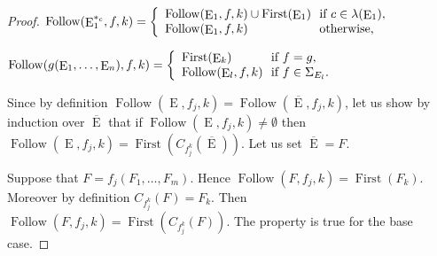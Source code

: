 \documentclass{llncs}
\DeclareMathOperator{\E}{E}
\DeclareMathOperator{\First}{First}
\DeclareMathOperator{\Follow}{Follow}
\def\b#1{\overline{#1}}
\begin{document}
\begin{proof}
  \centerline{
    $\Follow(\E_1^{*_c},f,k)=
      \left\{
        \begin{array}{l@{\ }l}
          \Follow(\E_1,f,k) \cup \First(\E_1) & \text{ if } c\in\lambda(\E_1),\\
          \Follow(\E_1,f,k) & \text{ otherwise,}\\ 
        \end{array}
      \right.$
  }
  
  \centerline{
    $\Follow(g(\E_1,\ldots,\E_n),f,k)=
      \left\{
        \begin{array}{l@{\ }l}
          \First(\E_k) & \text{ if } f=g,\\
          \Follow(\E_l,f,k) & \text{ if } f\in \Sigma_{E_l}.\\ 
        \end{array}
      \right.$
  }
  
Since by definition $\Follow(\E,f_j,k)=\Follow(\b\E,f_j,k)$, let us show by induction over $\b \E$ that if $\Follow(\E,f_j,k)\neq \emptyset$ then $\Follow(\E,f_j,k)=\First(C_{f_j^k}(\overline{\E}))$. Let us set $\b\E=F$.
 
Suppose that $F=f_j(F_1,\dots,F_m)$. Hence $\Follow(F,f_j,k)=\First(F_k)$. Moreover by definition $C_{f^k_j}(F)=F_k$. Then $\Follow(F,f_j,k)=\First(C_{f^k_j}(F))$. The property is true for the base case.


\end{proof}
\end{document}
